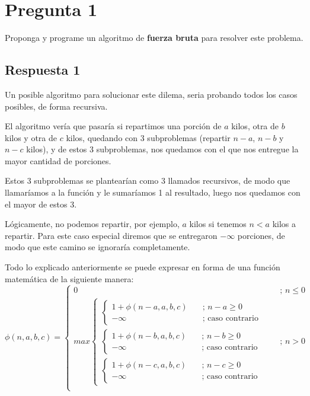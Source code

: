 \documentclass[spanish, fleqn]{article}
\begin{document}
\section{Pregunta 1}
Proponga y programe un algoritmo de \textbf{fuerza bruta} para resolver este problema. 

\subsection{Respuesta 1}

Un posible algoritmo para solucionar este dilema, seria probando todos los casos posibles, de forma recursiva.

El algoritmo vería que pasaría si repartimos una porción de $a$ kilos, otra de $b$ kilos y otra de $c$ kilos, quedando con 3 subproblemas (repartir $n-a$, $n-b$ y $n-c$ kilos), y de estos 3 subproblemas,  nos quedamos con el que nos entregue la mayor cantidad de porciones.

Estos 3 subproblemas se plantearían como 3 llamados recursivos, de modo que llamaríamos a la función y le sumaríamos 1 al resultado, luego nos quedamos con el mayor de estos 3.

Lógicamente, no podemos repartir, por ejemplo, $a$ kilos si tenemos $n < a$ kilos a repartir. Para este caso especial diremos que se entregaron $-\infty$ porciones, de modo que este camino se ignoraría completamente.

Todo lo explicado anteriormente se puede expresar en forma de una función matemática de la siguiente manera:
\[   
\phi(n, a, b, c) = 
    \begin{cases}
        0 & \quad \text{; } n \leq 0\\
        max 
            \begin{cases}
                \begin{cases}
                    1 + \phi(n-a, a, b, c) & \quad \text{; } n-a \geq 0 \\
                    -\infty & \quad \text{; caso contrario}
                \end{cases}\\
                \begin{cases}
                    1 + \phi(n-b, a, b, c) & \quad \text{; } n-b \geq 0 \\
                    -\infty & \quad \text{; caso contrario}
                \end{cases}\\
                \begin{cases}
                    1+ \phi(n-c, a, b, c) & \quad \text{; } n-c \geq 0 \\
                    -\infty & \quad \text{; caso contrario}
                \end{cases}
           \end{cases}
        & \quad \text{; }n > 0\\
     \end{cases}
\]
\end{document}

